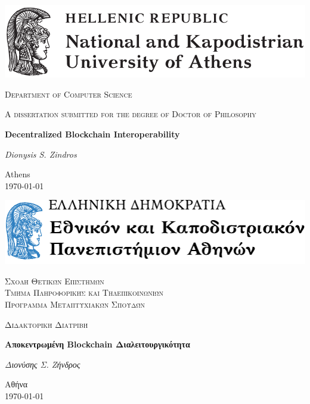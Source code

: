 \begin{titlepage}
  \centering
  \includegraphics[width=\textwidth]{chapters/preface/figures/uoa.pdf}\par\vspace{1cm}
  {\scshape\Large Department of Computer Science\par}
  \vspace{1cm}
  {\scshape A dissertation submitted for the degree of Doctor of Philosophy\par}
  \vspace{1cm}
  {\huge\bfseries Decentralized Blockchain Interoperability\par}
  \vspace{2cm}
  {\Large\itshape Dionysis \ifuniversity S. \fi Zindros\par}
	\vfill
	{\large Athens\\\today\par}
\end{titlepage}
\newpage\null\thispagestyle{empty}\newpage

\ifuniversity
\begin{titlepage}
  \setcounter{page}{3}
  \centering
  \includegraphics[width=\textwidth]{chapters/preface/figures/uoa-greek.pdf}\par\vspace{1cm}
  {\scshape\Large
  \ifuniversity
  Σχολή Θετικών Επιστημών\\
  \fi
  Τμήμα Πληροφορικής και Τηλεπικοινωνιών
  \ifuniversity
  \\
  Πρόγραμμα Μεταπτυχιακών Σπουδών
  \fi
  \par}
  \vspace{1cm}
  {\scshape Διδακτορική Διατριβή\par}
  \vspace{1cm}
  {\huge\bfseries Αποκεντρωμένη Blockchain Διαλειτουργικότητα \par}
  \vspace{2cm}
  {\Large\itshape Διονύσης \ifuniversity Σ. \fi Ζήνδρος\par}
	\vfill
	{\large Αθήνα\\\textgreek{\today}\par}
\end{titlepage}
\newpage\null\thispagestyle{empty}\newpage
\fi
